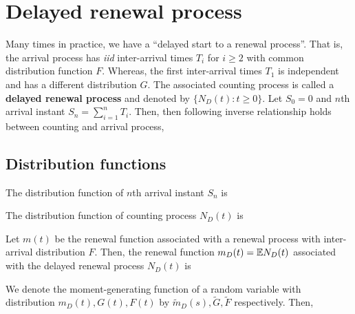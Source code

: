 \documentclass[a4paper,10pt,english]{article}
\begin{document}
\section{Delayed renewal process}
Many times in practice, we have a ``delayed start to a renewal process''. 
That is, the arrival process has \textit{iid} inter-arrival times $T_i$ for $i \geq 2$ with common distribution function $F$. 
Whereas, the first inter-arrival times $T_1$ is independent and has a different distribution $G$.  
The associated counting process is called %
a \textbf{delayed renewal process} and denoted by $\{N_D(t): t \geqslant 0\}$.  
Let $S_0=0$ and $n$th arrival instant $S_n =\sum_{i=1}^{n}T_i$. 
Then, then following inverse relationship holds between counting and arrival process, 
\subsection{Distribution functions}
\begin{lem} 
The distribution function of $n$th arrival instant $S_n$ is
\end{lem}
\begin{lem} 
The distribution function of counting process $N_D(t)$ is 
\end{lem} 
\begin{lem}
Let $m(t)$ be the renewal function associated with a renewal process with inter-arrival distribution $F$. 
Then, the renewal function $m_D(t) = \mathbb{E} N_D(t)$ associated with the delayed renewal process $N_D(t)$ is 
\end{lem}
\begin{lem}
We denote the moment-generating function of a random variable with distribution $m_D(t), G(t), F(t)$ by $\tilde{m}_D(s), \tilde{G}, \tilde{F}$ respectively. 
Then, 
\end{lem}
\end{document}
